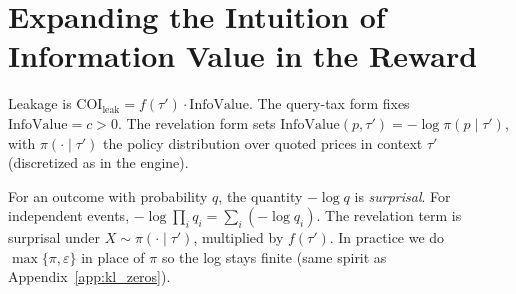 \documentclass[12pt,letterpaper]{article}
\begin{document}
\section{Expanding the Intuition of Information Value in the Reward}
\label{app:revelation_log}

Leakage is $\text{COI}_{\text{leak}} = f(\tau')\cdot\text{InfoValue}$. The query-tax form fixes $\text{InfoValue}=c>0$. The revelation form sets $\text{InfoValue}(p,\tau')=-\log\pi(p\mid\tau')$, with $\pi(\cdot\mid\tau')$ the policy distribution over quoted prices in context $\tau'$ (discretized as in the engine).

For an outcome with probability $q$, the quantity $-\log q$ is \emph{surprisal}. For independent events, $-\log\prod_i q_i=\sum_i(-\log q_i)$. The revelation term is surprisal under $X\sim\pi(\cdot\mid\tau')$, multiplied by $f(\tau')$. In practice we do $\max\{\pi,\varepsilon\}$ in place of $\pi$ so the log stays finite (same spirit as Appendix~\ref{app:kl_zeros}).


% 
\end{document}
